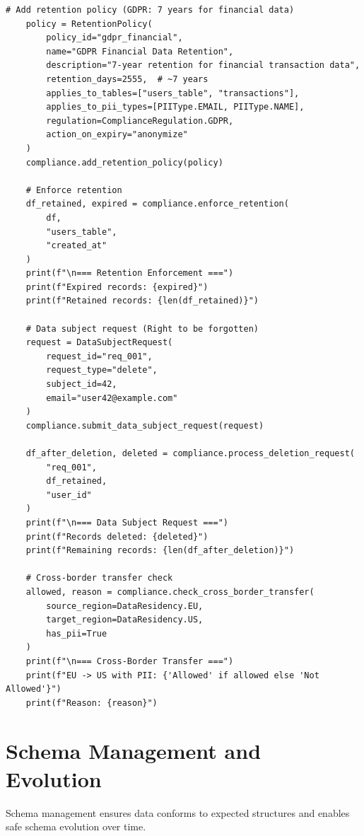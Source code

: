 \begin{lstlisting}[style=python, caption={Comprehensive data privacy compliance framework}]
    # Add retention policy (GDPR: 7 years for financial data)
    policy = RetentionPolicy(
        policy_id="gdpr_financial",
        name="GDPR Financial Data Retention",
        description="7-year retention for financial transaction data",
        retention_days=2555,  # ~7 years
        applies_to_tables=["users_table", "transactions"],
        applies_to_pii_types=[PIIType.EMAIL, PIIType.NAME],
        regulation=ComplianceRegulation.GDPR,
        action_on_expiry="anonymize"
    )
    compliance.add_retention_policy(policy)

    # Enforce retention
    df_retained, expired = compliance.enforce_retention(
        df,
        "users_table",
        "created_at"
    )
    print(f"\n=== Retention Enforcement ===")
    print(f"Expired records: {expired}")
    print(f"Retained records: {len(df_retained)}")

    # Data subject request (Right to be forgotten)
    request = DataSubjectRequest(
        request_id="req_001",
        request_type="delete",
        subject_id=42,
        email="user42@example.com"
    )
    compliance.submit_data_subject_request(request)

    df_after_deletion, deleted = compliance.process_deletion_request(
        "req_001",
        df_retained,
        "user_id"
    )
    print(f"\n=== Data Subject Request ===")
    print(f"Records deleted: {deleted}")
    print(f"Remaining records: {len(df_after_deletion)}")

    # Cross-border transfer check
    allowed, reason = compliance.check_cross_border_transfer(
        source_region=DataResidency.EU,
        target_region=DataResidency.US,
        has_pii=True
    )
    print(f"\n=== Cross-Border Transfer ===")
    print(f"EU -> US with PII: {'Allowed' if allowed else 'Not Allowed'}")
    print(f"Reason: {reason}")
\end{lstlisting}

\section{Schema Management and Evolution}

Schema management ensures data conforms to expected structures and enables safe schema evolution over time.

